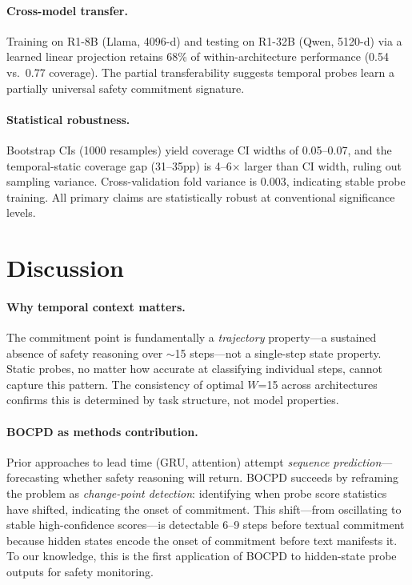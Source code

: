 \documentclass[11pt,a4paper]{article}
\begin{document}
\paragraph{Cross-model transfer.} Training on R1-8B (Llama, 4096-d) and testing on R1-32B (Qwen, 5120-d) via a learned linear projection retains 68\% of within-architecture performance (0.54 vs.\ 0.77 coverage). The partial transferability suggests temporal probes learn a partially universal safety commitment signature.

\paragraph{Statistical robustness.} Bootstrap CIs (1000 resamples) yield coverage CI widths of 0.05--0.07, and the temporal-static coverage gap (31--35pp) is 4--6$\times$ larger than CI width, ruling out sampling variance. Cross-validation fold variance is 0.003, indicating stable probe training. All primary claims are statistically robust at conventional significance levels.

\section{Discussion}
\label{sec:discussion}

\paragraph{Why temporal context matters.} The commitment point is fundamentally a \emph{trajectory} property---a sustained absence of safety reasoning over $\sim$15 steps---not a single-step state property. Static probes, no matter how accurate at classifying individual steps, cannot capture this pattern. The consistency of optimal $W$=15 across architectures confirms this is determined by task structure, not model properties.

\paragraph{BOCPD as methods contribution.} Prior approaches to lead time (GRU, attention) attempt \emph{sequence prediction}---forecasting whether safety reasoning will return. BOCPD succeeds by reframing the problem as \emph{change-point detection}: identifying when probe score statistics have shifted, indicating the onset of commitment. This shift---from oscillating to stable high-confidence scores---is detectable 6--9 steps before textual commitment because hidden states encode the onset of commitment before text manifests it. To our knowledge, this is the first application of BOCPD to hidden-state probe outputs for safety monitoring.
\end{document}
